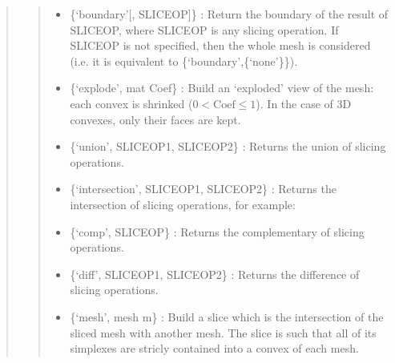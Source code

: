 \documentclass[a4paper,11pt,english]{sphinxmanual}
\begin{document}
\begin{quote}
\begin{quote}
\begin{itemize}
\item {} 
\sphinxAtStartPar
\{‘boundary’{[}, SLICEOP{]}\} :
Return the boundary of the result of SLICEOP, where SLICEOP is any
slicing operation. If SLICEOP is not specified, then the whole mesh is
considered (i.e. it is equivalent to \{‘boundary’,\{‘none’\}\}).

\item {} 
\sphinxAtStartPar
\{‘explode’, mat Coef\} :
Build an ‘exploded’ view of the mesh: each convex is shrinked (\(0 <
\text{Coef} \leq 1\)). In the case of 3D convexes, only their faces are kept.

\item {} 
\sphinxAtStartPar
\{‘union’, SLICEOP1, SLICEOP2\} :
Returns the union of slicing operations.

\item {} 
\sphinxAtStartPar
\{‘intersection’, SLICEOP1, SLICEOP2\} :
Returns the intersection of slicing operations, for example:

\begin{sphinxVerbatim}[commandchars=\\\{\}]
  
\end{sphinxVerbatim}

\item {} 
\sphinxAtStartPar
\{‘comp’, SLICEOP\} :
Returns the complementary of slicing operations.

\item {} 
\sphinxAtStartPar
\{‘diff’, SLICEOP1, SLICEOP2\} :
Returns the difference of slicing operations.

\item {} 
\sphinxAtStartPar
\{‘mesh’, mesh m\} :
Build a slice which is the intersection of the sliced mesh with another
mesh. The slice is such that all of its simplexes are stricly contained
into a convex of each mesh.

\end{itemize}
\end{quote}


\end{quote}
\end{document}
